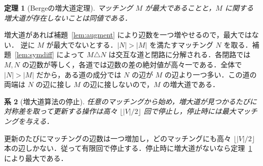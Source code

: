 \documentclass[a5paper,10pt,onecolumn]{jsarticle}
\makeatletter
\theoremstyle{mathnotetheorem}
\newtheorem{theorem}{定理}[section]
\newtheorem{corollary}[theorem]{系}
\renewcommand{\proofname}{証明}
\renewenvironment{proof}[1][\proofname]{%
  \par\pushQED{\qed}\normalfont\topsep4\p@\@plus2\p@\relax
  \trivlist\item[\hskip\labelsep\bfseries #1]\ignorespaces
}{\popQED\endtrivlist\@endpefalse}
\makeatother
\begin{document}
\begin{theorem}[Bergeの増大道定理]\label{thm:berge}
マッチング $M$ が最大であることと，$M$ に関する増大道が存在しないことは同値である．
\end{theorem}
\begin{proof}
増大道があれば補題~\ref{lem:augment} により辺数を一つ増やせるので，最大ではない．
逆に $M$ が最大でないとする．$|N|>|M|$ を満たすマッチング $N$ を取る．補題~\ref{lem:symdiff} によって $M\triangle N$ は交互な道と閉路に分解される．各閉路では $M,N$ の辺数が等しく，各道では辺数の差の絶対値が高々一である．全体で $|N|>|M|$ だから，ある道の成分では $N$ の辺が $M$ の辺より一つ多い．この道の両端は $N$ の辺に接し $M$ の辺に接しないので，$M$ の増大道である．
\end{proof}

\begin{corollary}[増大道算法の停止]
任意のマッチングから始め，増大道が見つかるたびに対称差を取って更新する操作は高々 $\lfloor |V|/2\rfloor$ 回で停止し，停止時には最大マッチングを与える．
\end{corollary}
\begin{proof}
更新のたびにマッチングの辺数は一つ増加し，どのマッチングにも高々 $\lfloor|V|/2\rfloor$ 本の辺しかない．従って有限回で停止する．停止時に増大道がないなら定理~\ref{thm:berge} により最大である．
\end{proof}
\end{document}
